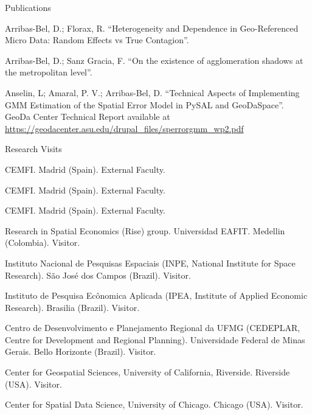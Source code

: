 \documentclass[12pt,2up]{article}
\begin{document}
\begin{cv}{}
\begin{cvlist}{Publications}
\item[\textbf{Working Papers}]

\item[2013] Arribas-Bel, D.; Florax, R. ``Heterogeneity and Dependence in
    Geo-Referenced Micro Data: Random Effects vs True Contagion''.

\item[] Arribas-Bel, D.; Sanz Gracia, F. ``On the existence of
    agglomeration shadows at the metropolitan level''.

\item[2012] Anselin, L; Amaral, P. V.; Arribas-Bel, D. ``Technical Aspects of
    Implementing GMM Estimation of the Spatial Error Model in PySAL and GeoDaSpace''.
    GeoDa Center Technical Report available at
    \url{https://geodacenter.asu.edu/drupal_files/sperrorgmm_wp2.pdf}

\end{cvlist}


 \begin{cvlist}{Research Visits}
 \item[2023] CEMFI. Madrid (Spain). External Faculty.
 \item[2022] CEMFI. Madrid (Spain). External Faculty.
 \item[2021] CEMFI. Madrid (Spain). External Faculty.
 \item[2019] Research in Spatial Economics (Rise) group. Universidad
     EAFIT. Medellin (Colombia). Visitor.

 \item[] Instituto Nacional de Pesquisas Espaciais (INPE, National
     Institute for Space Research). S\~ao Jos\'e dos Campos (Brazil). Visitor.

 \item[] Instituto de Pesquisa Ec\^onomica Aplicada (IPEA, Institute of
     Applied Economic Research). Brasilia (Brazil). Visitor.

 \item[] Centro de Desenvolvimento e Planejamento Regional da UFMG (CEDEPLAR,
     Centre for Development and Regional Planning). Universidade Federal de
     Minas Gerais. Bello Horizonte (Brazil). Visitor.

 \item[2018] Center for Geospatial Sciences, University of California,
     Riverside. Riverside (USA). Visitor.

 \item[2017] Center for Spatial Data Science, University of Chicago. Chicago
     (USA). Visitor.


\end{cvlist}
\end{cv}
\end{document}
